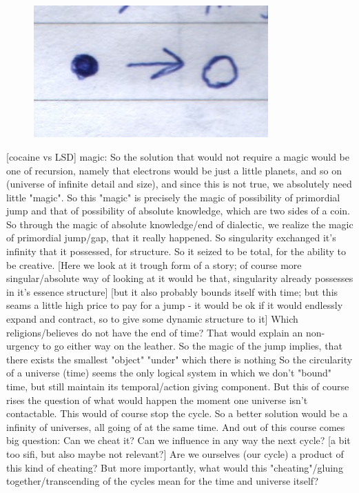 \documentclass{book}
\begin{document}
\begin{figure}[ht!]
\centering
\includegraphics[width=90mm]{scan05.jpg}
\label{overflow}
\end{figure}

[cocaine vs LSD]
magic:
So the solution that would not require a magic would be one of recursion, namely that electrons would be just a little planets, and so on (universe of infinite detail and size), and since this is not true, we absolutely need little "magic". So this "magic" is precisely the magic of possibility of primordial jump and that of possibility of absolute knowledge, which are two sides of a coin. So through the magic of absolute knowledge/end of dialectic, we realize the magic of primordial jump/gap, that it really happened. So singularity exchanged it's infinity that it possessed, for structure. So it seized to be total, for the ability to be creative. [Here we look at it trough form of a story; of course more singular/absolute way of looking at it would be that, singularity already possesses in it's essence structure] [but it also probably bounds itself with time; but this seams a little high price to pay for a jump - it would be ok if it would endlessly expand and contract, so to give some dynamic structure to it]
Which religions/believes do not have the end of time? That would explain an non-urgency to go either way on the leather.
So the magic of the jump implies, that there exists the smallest "object" "under" which there is nothing
So the circularity of a universe (time) seems the only logical system in which we don't "bound" time, but still maintain its temporal/action giving component.
But this of course rises the question of what would happen the moment one universe isn't contactable. This would of course stop the cycle. So a better solution would be a infinity of universes, all going of at the same time.
And out of this course comes big question: Can we cheat it? Can we influence in any way the next cycle? [a bit too sifi, but also maybe not relevant?] Are we ourselves (our cycle) a product of this kind of cheating? But more importantly, what would this "cheating"/gluing together/transcending of the cycles mean for the time and universe itself?
\end{document}

